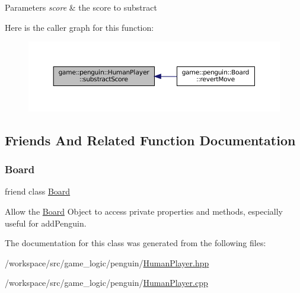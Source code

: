 \begin{DoxyParams}{Parameters}
{\em score} & the score to substract \\
\hline
\end{DoxyParams}
Here is the caller graph for this function\+:
\nopagebreak
\begin{figure}[H]
\begin{center}
\leavevmode
\includegraphics[width=350pt]{classgame_1_1penguin_1_1_human_player_ac164fc99bfe3fc2c6818aeb7d41fc885_icgraph}
\end{center}
\end{figure}


\subsection{Friends And Related Function Documentation}
\mbox{\label{classgame_1_1penguin_1_1_human_player_a12525b6ed7c8186be0bee5cf78e2a49c}} 
\subsubsection{\texorpdfstring{Board}{Board}}
{\footnotesize\ttfamily friend class \hyperlink{classgame_1_1penguin_1_1_board}{Board}\hspace{0.3cm}{\ttfamily [friend]}}



Allow the \hyperlink{classgame_1_1penguin_1_1_board}{Board} Object to access private properties and methods, especially useful for add\+Penguin. 



The documentation for this class was generated from the following files\+:\begin{DoxyCompactItemize}
\item 
/workspace/src/game\+\_\+logic/penguin/\hyperlink{_human_player_8hpp}{Human\+Player.\+hpp}\item 
/workspace/src/game\+\_\+logic/penguin/\hyperlink{_human_player_8cpp}{Human\+Player.\+cpp}\end{DoxyCompactItemize}
